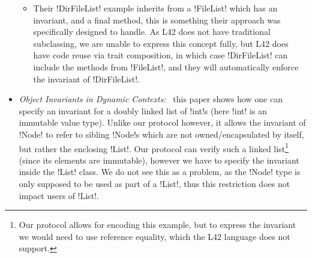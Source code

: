 \begin{itemize}
\begin{itemize}
		\item Their \Q!DirFileList! example inherits from a \Q!FileList! which has an invariant, and a final method, this is something their approach was specifically designed to handle. As L42 does not have traditional subclassing, we are unable to express this concept fully, but L42 does have code reuse via trait composition, in which case \Q!DirFileList! 
can include the methods from 
\Q!FileList!, and they will automatically enforce the invariant of \Q!DirFileList!. %
	\end{itemize}

	\item \emph{Object Invariants in Dynamic Contexts:}~\cite{leino2004object} this paper shows how one can specify an invariant for a doubly linked list of \Q!int!s (here \Q!int! is an immutable value type). Unlike our protocol however, it allows the invariant of \Q!Node! to refer to sibling \Q!Node!s which are not owned/encapsulated by itself, but rather the enclosing \Q!List!. Our protocol can verify such a linked list\footnote{%
Our protocol allows for encoding this example, but
to express the invariant we would need to 
use reference equality, which the L42 language does not support.
} (since its elements are immutable), however we have to specify the invariant inside the \Q!List! class. We do not see this as a problem, as the \Q!Node! type is only supposed to be used as part of a \Q!List!, thus this restriction does not impact users of \Q!List!.
	

\end{itemize}
